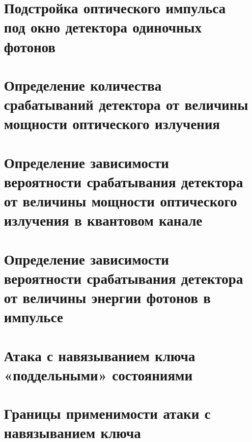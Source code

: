 \section{Подстройка оптического импульса под окно детектора одиночных фотонов} \label{sec:ch2/sec6}



\section{Определение количества срабатываний детектора от величины мощности оптического излучения} \label{sec:ch2/sec7}




\section{Определение зависимости вероятности срабатывания детектора от величины мощности оптического излучения в квантовом канале} \label{sec:ch2/sec8}




\section{Определение зависимости вероятности срабатывания детектора от величины энергии фотонов в импульсе} \label{sec:ch2/sec9}


\section{Атака с навязыванием ключа «поддельными» состояниями} \label{sec:ch2/sec10}


\section{Границы применимости атаки с навязыванием ключа} \label{sec:ch2/sec11}




